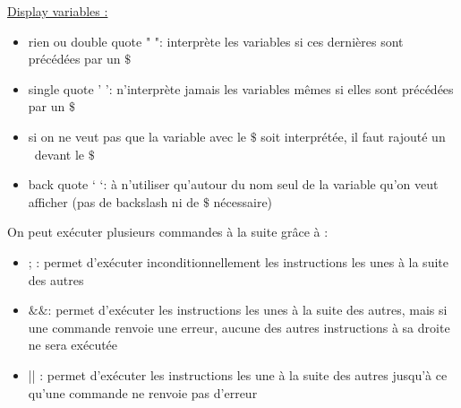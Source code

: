 \documentclass{article}
\begin{document}
\noindent \underline{Display variables :}
\begin{itemize}
    \item rien ou double quote  " ": interprète les variables si ces dernières sont précédées par un $\$$
    \item single quote ' ': n'interprète jamais les variables mêmes si elles sont précédées par un $\$$
    \item si on ne veut pas que la variable avec le $\$$ soit interprétée, il faut rajouté un \ devant le $\$$
    \item back quote ` `: à n'utiliser qu'autour du nom seul de la variable qu'on veut afficher (pas de backslash ni de $\$$ nécessaire)
\end{itemize}

\noindent On peut exécuter plusieurs commandes à la suite grâce à :
\begin{itemize}
    \item ; : permet d'exécuter inconditionnellement les instructions les unes à la suite des autres
    \item $\&\&$: permet d'exécuter les instructions les unes à la suite des autres, mais si une commande renvoie une erreur, aucune des autres instructions à sa droite ne sera exécutée
    \item || : permet d'exécuter les instructions les une à la suite des autres jusqu'à ce qu'une commande ne renvoie pas d'erreur
\end{itemize}

\newpage
\end{document}
